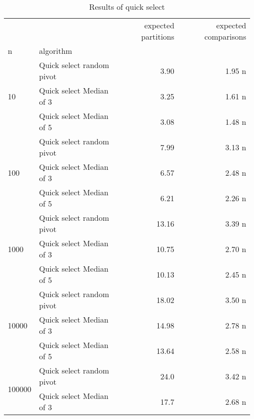 \documentclass{homeworg}
\begin{document}
\begin{table}[htbp]
\label{q4:result}
\caption{Results of quick select}
\begin{tabular}{llrr}
\toprule
    &                          &  expected partitions  & expected comparisons \\
n & algorithm &                                              &                                                 \\
\midrule
\multirow{3}{*}{10} & Quick select random pivot &                                         3.90 &                                          1.95 
n \\
    & Quick select Median of 3 &                                         3.25 &                                          1.61 n \\
    & Quick select Median of 5 &                                         3.08 &                                          1.48 n \\
\cline{1-4}
\multirow{3}{*}{100} & Quick select random pivot &                                         7.99 &                                          3.13 n \\
    & Quick select Median of 3 &                                         6.57 &                                          2.48 n \\
    & Quick select Median of 5 &                                         6.21 &                                          2.26 n \\
\cline{1-4}
\multirow{3}{*}{1000} & Quick select random pivot &                13.16 &               3.39 n \\
      & Quick select Median of 3 &                10.75 &               2.70 n \\
      & Quick select Median of 5 &                10.13 &               2.45 n \\
\cline{1-4}
\multirow{3}{*}{10000} & Quick select random pivot &                18.02 &               3.50 n \\
      & Quick select Median of 3 &                14.98 &               2.78 n \\
      & Quick select Median of 5 &                13.64 &               2.58 n \\
\cline{1-4}
\multirow{3}{*}{100000} & Quick select random pivot &                 24.0 &               3.42 n \\
       & Quick select Median of 3 &                 17.7 &               2.68 n \\

\end{tabular}
\end{table}
\end{document}

